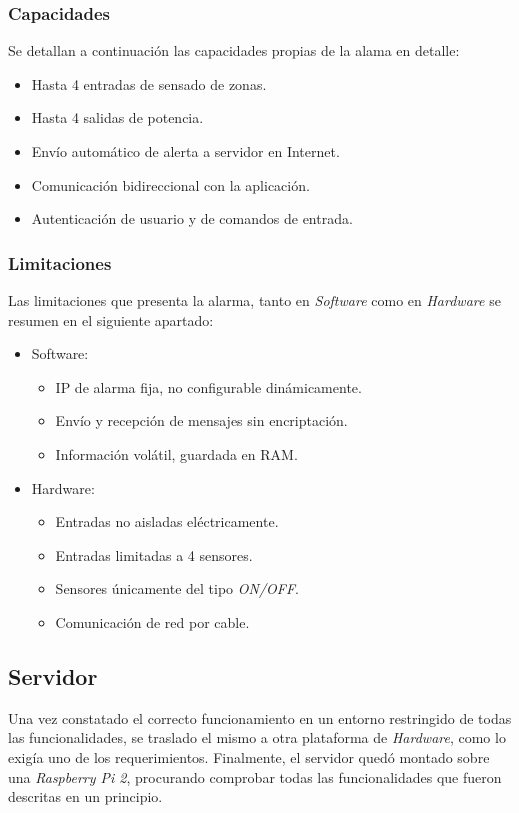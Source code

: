 		\subsubsection{Capacidades}
Se detallan a continuación las capacidades propias de la alama en detalle:

\begin{itemize}
\item Hasta 4 entradas de sensado de zonas.
\item Hasta 4 salidas de potencia.
\item Envío automático de alerta a servidor en Internet.
\item Comunicación bidireccional con la aplicación.
\item Autenticación de usuario y de comandos de entrada.
\end{itemize}		
		
		\subsubsection{Limitaciones}
		
Las limitaciones que presenta la alarma, tanto en \textit{Software} como en \textit{Hardware} se resumen en el siguiente apartado:

\begin{itemize}
\item Software: 
	\begin{itemize}
	\item IP de alarma fija, no configurable dinámicamente. 	
	\item Envío y recepción de mensajes sin encriptación.
	\item Información volátil, guardada en RAM.
	\end{itemize}
\item Hardware:
	\begin{itemize}
	\item Entradas no aisladas eléctricamente.
	\item Entradas limitadas a 4 sensores.
	\item Sensores únicamente del tipo \textit{ON/OFF}.
	\item Comunicación de red por cable.
	\end{itemize}
\end{itemize}
\newpage		

\subsection{Servidor}
Una vez constatado el correcto funcionamiento en un entorno restringido de todas las funcionalidades, se traslado el mismo a otra plataforma de \textit{Hardware}, como lo exigía uno de los requerimientos.
Finalmente, el servidor quedó montado sobre una \textit{Raspberry Pi 2}, procurando comprobar todas las funcionalidades que fueron descritas en un principio.\\


